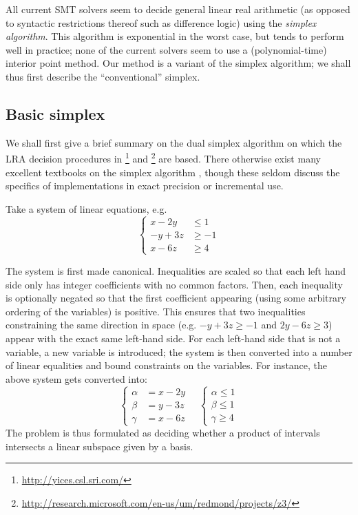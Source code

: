 All current SMT solvers seem to decide general linear real arithmetic (as opposed to syntactic restrictions thereof such as difference logic) using the \emph{simplex algorithm}. This algorithm is exponential in the worst case, but tends to perform well in practice; none of the current solvers seem to use a (polynomial-time) interior point method. Our method is a variant of the simplex algorithm; we shall thus first describe the ``conventional'' simplex.

\subsection{Basic simplex}\label{part:basic_simplex}
We shall first give a brief summary on the dual simplex algorithm on which the LRA decision procedures in \footnote{\url{http://yices.csl.sri.com/}}
\cite{SRI-CSL-06-01,DBLP:conf/cav/DutertreM06} and \footnote{\url{http://research.microsoft.com/en-us/um/redmond/projects/z3/}}
\cite{DBLP:conf/tacas/MouraB08}
are based. There otherwise exist many excellent textbooks on the simplex algorithm \cite{Dantzig1998,Schrijver98}, though these seldom discuss the specifics of implementations in exact precision or incremental use.

Take a system of linear equations, e.g.
\begin{equation}
\left\{\begin{array}{ll}
x - 2y & \leq 1 \\
-y + 3z & \geq -1 \\
x - 6z & \geq 4
\end{array}
\right.
\end{equation}

The system is first made canonical. Inequalities are scaled so that each left hand side only has integer coefficients with no common factors. Then, each inequality is optionally negated so that the first coefficient appearing (using some arbitrary ordering of the variables) is positive. This ensures that two inequalities constraining the same direction in space (e.g. $-y + 3z \geq -1$ and $2y-6z \geq 3$) appear with the exact same left-hand side. For each left-hand side that is not a variable, a new variable is introduced; the system is then converted into a number of linear equalities and bound constraints on the variables. For instance, the above system gets converted into:
\begin{equation}
\left\{\begin{array}{ll}
\alpha &= x - 2y \\
\beta &= y - 3z \\
\gamma &= x - 6z
\end{array}\right.
\quad
\left\{\begin{array}{ll}
\alpha \leq 1\\
\beta \leq 1\\
\gamma \geq 4
\end{array}\right.
\end{equation}
The problem is thus formulated as deciding whether a product of intervals intersects a linear subspace given by a basis.

